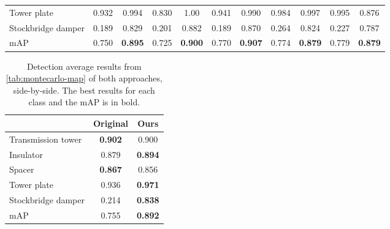 \documentclass[10pt,conference]{IEEEtran}
\begin{document}
\begin{table*}[htpb]
\begin{tabular}{lcccccccccc}
Tower plate        & 0.932                      & 0.994                    & 0.830                      & 1.00                     & 0.941                      & 0.990                    & 0.984                      & 0.997                    & 0.995                      & 0.876                    \\
Stockbridge damper & 0.189                      & 0.829                    & 0.201                      & 0.882                    & 0.189                      & 0.870                    & 0.264                      & 0.824                    & 0.227                      & 0.787                    \\
\midrule
mAP                & 0.750                      & \textbf{0.895}                    & 0.725                      & \textbf{0.900}                    & 0.770                      & \textbf{0.907}                    & 0.774                      & \textbf{0.879}                    & 0.779                      & \textbf{0.879}           
         \\
\bottomrule        
\end{tabular}
\label{tab:montecarlo-map}
\end{table*}

\begin{table}[htpb]
\centering
\caption{Detection average results from \autoref{tab:montecarlo-map} of both approaches, side-by-side. The best results for each class and the mAP is in bold.}
\begin{tabular}{lcc}
\toprule
                   & \multicolumn{1}{c}{Original} & \multicolumn{1}{c}{Ours} \\
\midrule
Transmission tower & \textbf{0.902}                      & 0.900                    \\
Insulator          & 0.879                      & \textbf{0.894}           \\
Spacer             & \textbf{0.867}                      & 0.856                    \\
Tower plate        & 0.936                      & \textbf{0.971}           \\
Stockbridge damper & 0.214                      & \textbf{0.838}           \\
\midrule
mAP                & 0.755                      & \textbf{0.892}          \\
\bottomrule
\end{tabular}
\label{tab:resizevsproposed}
\end{table}
\end{document}
